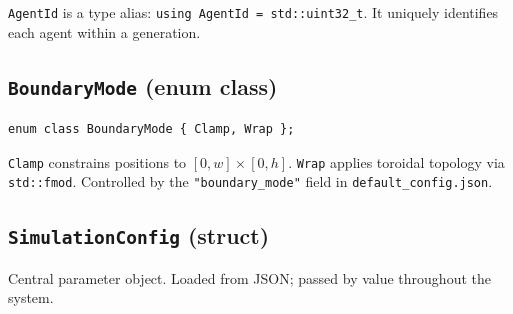\texttt{AgentId} is a type alias: \texttt{using AgentId = std::uint32\_t}.  It uniquely
identifies each agent within a generation.

\subsection{\texttt{BoundaryMode} (enum class)}

\begin{lstlisting}
enum class BoundaryMode { Clamp, Wrap };
\end{lstlisting}

\texttt{Clamp} constrains positions to $[0,w]\times[0,h]$.
\texttt{Wrap} applies toroidal topology via \texttt{std::fmod}.
Controlled by the \texttt{"boundary\_mode"} field in \texttt{default\_config.json}.

\subsection{\texttt{SimulationConfig} (struct)}

Central parameter object.  Loaded from JSON; passed by value throughout the system.

